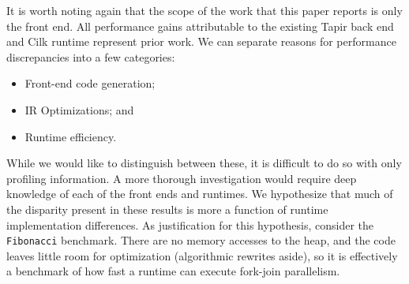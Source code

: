 \documentclass[sigconf]{acmart}
\newcommand{\wmnote}[1]{{\scriptsize \color{red} [[ Billy: #1]]}}
\begin{document}
It is worth noting again that the scope of the work that this paper reports
is only the front end. All performance gains attributable to
the existing Tapir back end and Cilk runtime represent prior work.  We can
separate reasons for performance discrepancies into a few categories:
\begin{itemize}
\item Front-end code generation;
\item IR Optimizations; and
\item Runtime efficiency.
\end{itemize}
While we would like to distinguish between these, it is difficult to do so with
only profiling information. A more thorough investigation would require deep
knowledge of each of the front ends and runtimes. We hypothesize that much of
the disparity present in these results is more a function of runtime
implementation differences. As justification for this hypothesis, consider the
\texttt{Fibonacci} benchmark. There are no memory accesses to the heap, and the
code leaves little room for optimization (algorithmic rewrites aside), so it is
effectively a benchmark of how fast a runtime can execute fork-join
parallelism.

\end{document}
